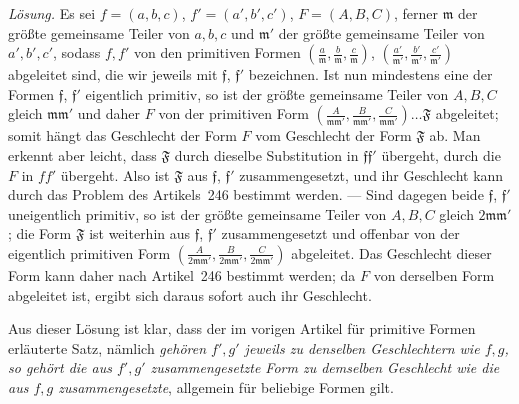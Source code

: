\textit{Lösung.} Es sei $f=(a,b,c)$, $f'=(a',b',c')$, $F=(A,B,C)$, ferner $\mathfrak{m}$ der größte gemeinsame Teiler von $a,b,c$ und $\mathfrak{m}'$ der größte gemeinsame Teiler von $a',b',c'$, sodass $f,f'$ von den primitiven Formen $(\frac{a}{\mathfrak{m}},\allowbreak \frac{b}{\mathfrak{m}},\allowbreak \frac{c}{\mathfrak{m}})$, $(\frac{a'}{\mathfrak{m}'},\allowbreak \frac{b'}{\mathfrak{m}'},\allowbreak \frac{c'}{\mathfrak{m}'})$ abgeleitet sind, die wir jeweils mit $\mathfrak{f}$, $\mathfrak{f}'$ bezeichnen. Ist nun mindestens eine der Formen $\mathfrak{f}$, $\mathfrak{f}'$ eigentlich primitiv, so ist der größte gemeinsame Teiler von $A,B,C$ gleich $\mathfrak{m}\mathfrak{m}'$ und daher $F$ von der primitiven Form $(\frac{A}{\mathfrak{m}\mathfrak{m}'},\allowbreak \frac{B}{\mathfrak{m}\mathfrak{m}'},\allowbreak \frac{C}{\mathfrak{m}\mathfrak{m}'})\ldots\mathfrak{F}$ abgeleitet; somit hängt das Geschlecht der Form $F$ vom Geschlecht der Form $\mathfrak{F}$ ab. Man erkennt aber leicht, dass $\mathfrak{F}$ durch dieselbe Substitution in $\mathfrak{f}\mathfrak{f}'$ übergeht, durch die $F$ in $ff'$ übergeht. Also ist $\mathfrak{F}$ aus $\mathfrak{f}$, $\mathfrak{f}'$ zusammengesetzt, und ihr Geschlecht kann durch das Problem des Artikels~246 bestimmt werden. --- Sind dagegen beide $\mathfrak{f}$, $\mathfrak{f}'$ uneigentlich primitiv, so ist der größte gemeinsame Teiler von $A,B,C$ gleich $2\mathfrak{m}\mathfrak{m}'$; die Form $\mathfrak{F}$ ist weiterhin aus $\mathfrak{f}$, $\mathfrak{f}'$ zusammengesetzt und offenbar von der eigentlich primitiven Form $(\frac{A}{2\mathfrak{m}\mathfrak{m}'},\allowbreak \frac{B}{2\mathfrak{m}\mathfrak{m}'},\allowbreak \frac{C}{2\mathfrak{m}\mathfrak{m}'})$ abgeleitet. Das Geschlecht dieser Form kann daher nach Artikel~246 bestimmt werden; da $F$ von derselben Form abgeleitet ist, ergibt sich daraus sofort auch ihr Geschlecht.

Aus dieser Lösung ist klar, dass der im vorigen Artikel für primitive Formen erläuterte Satz, nämlich \textit{gehören $f',g'$ jeweils zu denselben Geschlechtern wie $f,g$, so gehört die aus $f',g'$ zusammengesetzte Form zu demselben Geschlecht wie die aus $f,g$ zusammengesetzte}, allgemein für beliebige Formen gilt.
